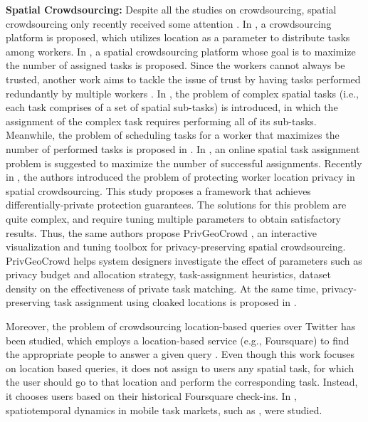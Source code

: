 \documentclass{USC-Thesis}
\numberwithin{equation}{chapter}
\begin{document}
\textbf{Spatial Crowdsourcing:} Despite all the studies on crowdsourcing, spatial crowdsourcing only recently received some attention \cite{to2014framework,deng2013maximizing,kazemi2013geotrucrowd,dang2013maximum,kazemi2012geocrowd,alt2010location}. In \cite{alt2010location}, a crowdsourcing platform is proposed, which utilizes location as a parameter to distribute tasks among workers. In \cite{kazemi2012geocrowd}, a spatial crowdsourcing platform whose goal is to maximize the number of assigned tasks is proposed. Since the workers cannot always be trusted, another work aims to tackle the issue of trust by having tasks performed redundantly by multiple workers \cite{kazemi2013geotrucrowd}. In \cite{dang2013maximum}, the problem of complex spatial tasks (i.e., each task comprises of a set of spatial sub-tasks) is introduced, in which the assignment of the complex task requires performing all of its sub-tasks. Meanwhile, the problem of scheduling tasks for a worker that maximizes the number of performed tasks is proposed in \cite{deng2013maximizing}. In \cite{Hassan2014a}, an online spatial task assignment problem is suggested to maximize the number of successful assignments. Recently in \cite{to2014framework}, the authors introduced the problem of protecting worker location privacy in spatial crowdsourcing. This study proposes a framework that achieves differentially-private protection guarantees. The solutions for this problem are quite complex, and require tuning multiple parameters to obtain satisfactory results. Thus, the same authors propose PrivGeoCrowd \cite{to2015privgeocrowd}, an interactive visualization and tuning toolbox for privacy-preserving spatial crowdsourcing. PrivGeoCrowd helps system designers investigate the effect of parameters such as privacy budget and allocation strategy, task-assignment heuristics, dataset density on the effectiveness of private task matching. At the same time, privacy-preserving task assignment using cloaked locations is proposed in \cite{pournajaf2014spatial}.

Moreover, the problem of crowdsourcing location-based queries over Twitter has been studied, which employs a location-based service (e.g., Foursquare) to find the appropriate people to answer a given query \cite{bulut2011crowdsourcing}. Even though this work focuses on location based queries, it does not assign to users any spatial task, for which the user should go to that location and perform the corresponding task. Instead, it chooses users based on their historical Foursquare check-ins. In \cite{musthag2013labor}, spatiotemporal dynamics in mobile task markets, such as \cite{fieldagent,gigwalk}, were studied.
\end{document}
